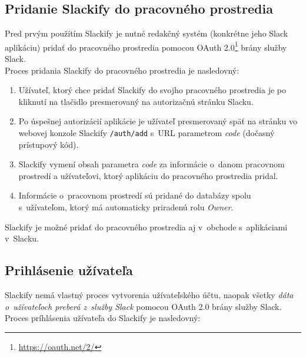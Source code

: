 \subsection{Pridanie Slackify do pracovného prostredia}
Pred prvým použítím Slackify je nutné redakčný systém (konkrétne jeho Slack aplikáciu) pridať do pracovného prostredia pomocou OAuth 2.0\footnote{\href{https://oauth.net/2/}{https://oauth.net/2/}} brány služby Slack.  \\

\noindent Proces pridania Slackify do pracovného prostredia je nasledovný:

\begin{enumerate}
	\item Užívateľ, ktorý chce pridať Slackify do svojho pracovného prostredia je po kliknutí na tlačidlo  presmerovaný na autorizačnú stránku Slacku.
	\item Po úspešnej autorizácií aplikácie je užívateľ presmerovaný späť na stránku vo webovej konzole Slackify \texttt{/auth/add} s~URL parametrom \textit{code} (dočasný prístupový kód).
	\item Slackify vymení obsah parametra \textit{code} za informácie o~danom pracovnom prostredí a užívateľovi, ktorý aplikáciu do pracovného prostredia pridal.
	\item Informácie o~pracovnom prostredí sú pridané do databázy spolu s~užívateľom, ktorý má automaticky priradenú rolu \emph{Owner}.
\end{enumerate}

\noindent Slackify je možné pridať do pracovného prostredia aj v~obchode s~aplikáciami v~Slacku. 

\subsection{Prihlásenie užívateľa}
Slackify nemá vlastný proces vytvorenia užívateľského účtu, naopak všetky \emph{dáta o~užívateľoch preberá z~služby Slack} pomocou OAuth 2.0 brány služby Slack. \\

\noindent Proces príhlásenia užívateľa do Slackify je nasledovný:

